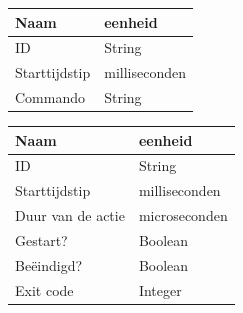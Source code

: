 \begin{figure}[htbf]

\begin{minipage}[b]{0.4\textwidth}
		\begin{tabular}{l|l}
			\textbf{Naam} & \textbf{eenheid} \\ 
			\hline ID & String \\ 
			Starttijdstip & milliseconden \\ 
			Commando & String \\ 
		\end{tabular} 
	\label{table:beschikbaarheidinput}
\end{minipage}
\hfill
\begin{minipage}[b]{0.5\textwidth}

\begin{tabular}{l|l}
\textbf{Naam} & \textbf{eenheid} \\ 
\hline ID & String \\ 
Starttijdstip & milliseconden \\ 
Duur van de actie & microseconden \\
Gestart? & Boolean \\
Beëindigd? & Boolean \\
Exit code & Integer 
\end{tabular}
\label{table:beschikbaarheidoutput}
\end{minipage}
\end{figure}


